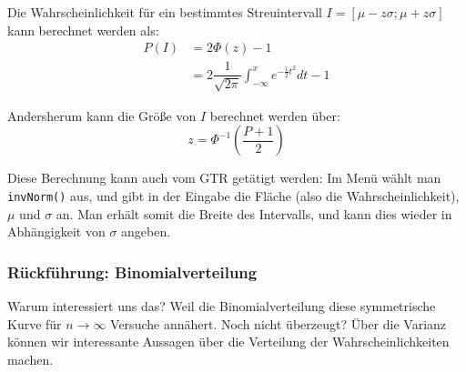 \documentclass[../MAIN/main.tex]{subfiles}
\begin{document}
\begin{Beweis}
  Die Wahrscheinlichkeit für ein bestimmtes Streuintervall $I=[\mu - z\sigma;\mu + z\sigma]$ kann berechnet werden als:
  \begin{align*}
    P(I) &= 2 \Phi(z)-1 \\
    &= 2 \dfrac{1}{\sqrt{2\pi}}\int_{-\infty}^{x} e^{-\frac{1}{2}t^2} dt -1
  \end{align*}
\end{Beweis}
\begin{Bemerkung}
  Andersherum kann die Größe von $I$ berechnet werden über:
  $$ z= \Phi^{-1} \left(\dfrac{P+1}{2}\right)$$
\end{Bemerkung}
\begin{GTR-Tipp}
  Diese Berechnung kann auch vom GTR getätigt werden: Im Menü  wählt man \texttt{invNorm()} aus, und gibt in der Eingabe die Fläche (also die Wahrscheinlichkeit), $\mu$ und $\sigma$ an. Man erhält somit die Breite des Intervalls, und kann dies wieder in Abhängigkeit von $\sigma$ angeben.
\end{GTR-Tipp}



\subsubsection{Rückführung: Binomialverteilung}
Warum interessiert uns das? Weil die Binomialverteilung diese symmetrische Kurve für $n\rightarrow\infty$ Versuche annähert. Noch nicht überzeugt? Über die Varianz können wir interessante Aussagen über die Verteilung der Wahrscheinlichkeiten machen.
\end{document}
